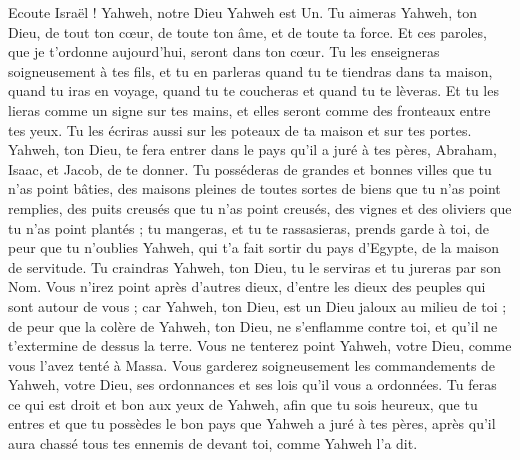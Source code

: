 \begin{multicols}{2}
Ecoute Israël ! Yahweh, notre Dieu Yahweh est Un.
Tu aimeras Yahweh, ton Dieu, de tout ton cœur, de toute ton âme, et de toute ta force.
Et ces paroles, que je t'ordonne aujourd'hui, seront dans ton cœur.
Tu les enseigneras soigneusement à tes fils, et tu en parleras quand tu te tiendras dans ta maison, quand tu iras en voyage, quand tu te coucheras et quand tu te lèveras.
Et tu les lieras comme un signe sur tes mains, et elles seront comme des fronteaux entre tes yeux.
Tu les écriras aussi sur les poteaux de ta maison et sur tes portes.
Yahweh, ton Dieu, te fera entrer dans le pays qu'il a juré à tes pères, Abraham, Isaac, et Jacob, de te donner. Tu posséderas de grandes et bonnes villes que tu n'as point bâties,
des maisons pleines de toutes sortes de biens que tu n'as point remplies, des puits creusés que tu n'as point creusés, des vignes et des oliviers que tu n'as point plantés ; tu mangeras, et tu te rassasieras,
prends garde à toi, de peur que tu n'oublies Yahweh, qui t'a fait sortir du pays d'Egypte, de la maison de servitude.
Tu craindras Yahweh, ton Dieu, tu le serviras et tu jureras par son Nom.
Vous n'irez point après d'autres dieux, d'entre les dieux des peuples qui sont autour de vous ;
car Yahweh, ton Dieu, est un Dieu jaloux au milieu de toi ; de peur que la colère de Yahweh, ton Dieu, ne s'enflamme contre toi, et qu'il ne t'extermine de dessus la terre.
Vous ne tenterez point Yahweh, votre Dieu, comme vous l'avez tenté à Massa.
Vous garderez soigneusement les commandements de Yahweh, votre Dieu, ses ordonnances et ses lois qu'il vous a ordonnées.
Tu feras ce qui est droit et bon aux yeux de Yahweh, afin que tu sois heureux, que tu entres et que tu possèdes le bon pays que Yahweh a juré à tes pères,
après qu'il aura chassé tous tes ennemis de devant toi, comme Yahweh l'a dit.

\end{multicols}
